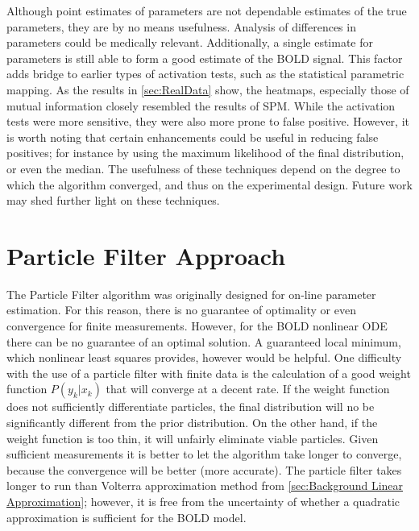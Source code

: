 Although point estimates of parameters are not dependable estimates of the 
true parameters, they are by no means usefulness. Analysis of differences in parameters
could be medically relevant. Additionally, a single estimate for parameters is still able
to form a good estimate of the BOLD signal. This factor adds bridge to 
earlier types of activation tests, such as the statistical
parametric mapping. As the results in \autoref{sec:RealData} show, the heatmaps, especially
those of mutual information closely resembled the results of SPM. While the activation
tests were more sensitive, they were also more prone to false positive. However, it is
worth noting that certain enhancements could be useful in reducing false positives; for instance
by using the maximum likelihood of the final distribution, or even the median. The 
usefulness of these techniques depend on the degree to which the algorithm converged, 
and thus on the experimental design. Future work may shed further light on these
techniques. 

\section{Particle Filter Approach}
The Particle Filter algorithm was originally designed for on-line parameter 
estimation. For this reason, there is no guarantee of optimality or even 
convergence for finite measurements. However, for the BOLD nonlinear ODE there
can be no guarantee of an optimal solution. A guaranteed local minimum,
which nonlinear least squares provides, however would be helpful. One difficulty
with the use of a particle filter with finite data is the calculation of a good
weight function $P(y_k | x_k)$  that will converge at a decent rate. If the weight
function does not sufficiently differentiate particles, the final distribution will 
no be significantly different from the prior distribution. On the other hand, if the 
weight function is too thin, it will unfairly eliminate viable particles. Given sufficient
measurements it is better to let the algorithm take longer to converge, because the
convergence will be better (more accurate). The particle filter takes longer
to run than Volterra approximation method from \autoref{sec:Background Linear Approximation};
however, it is free from the uncertainty of whether a quadratic approximation is 
sufficient for the BOLD model. 

